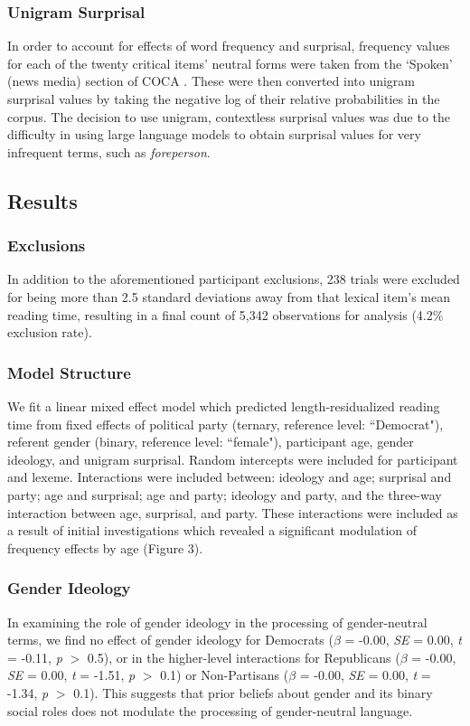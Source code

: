 \documentclass[10pt,letterpaper]{article}
\begin{document}
	\subsubsection{Unigram Surprisal}
	In order to account for effects of word frequency and surprisal, frequency values for each of the twenty critical items' neutral forms were taken from the `Spoken' (news media) section of COCA \parencite{coca}. These were then converted into unigram surprisal values by taking the negative log of their relative probabilities in the corpus. The decision to use unigram, contextless surprisal values was due to the difficulty in using large language models to obtain surprisal values for very infrequent terms, such as \textit{foreperson}. 
	
	\subsection{Results}
	
	\subsubsection{Exclusions}
	In addition to the aforementioned participant exclusions, 238 trials were excluded for being more than 2.5 standard deviations away from that lexical item's mean reading time, resulting in a final count of 5,342 observations for analysis (4.2\% exclusion rate).
	
	\subsubsection{Model Structure} 
	We fit a linear mixed effect model which predicted length-residualized reading time from fixed effects of political party (ternary, reference level: ``Democrat"), referent gender (binary, reference level: ``female"), participant age, gender ideology, and unigram surprisal. Random intercepts were included for participant and lexeme. Interactions were included between: ideology and age; surprisal and party; age and surprisal; age and party; ideology and party, and the three-way interaction between age, surprisal, and party. These interactions were included as a result of initial investigations which revealed a significant modulation of frequency effects by age (Figure 3).
	
	\subsubsection{Gender Ideology} In examining the role of gender ideology in the processing of gender-neutral terms, we find no effect of gender ideology for Democrats ($\beta$ = -0.00, \textit{SE} = 0.00, \textit{t} = -0.11, \textit{p} $>$ 0.5), or in the higher-level interactions for Republicans ($\beta$ = -0.00, \textit{SE} = 0.00, \textit{t} = -1.51, \textit{p} $>$ 0.1) or Non-Partisans ($\beta$ = -0.00, \textit{SE} = 0.00, \textit{t} = -1.34, \textit{p} $>$ 0.1). This suggests that prior beliefs about gender and its binary social roles does not modulate the processing of gender-neutral language.
	
\end{document}

